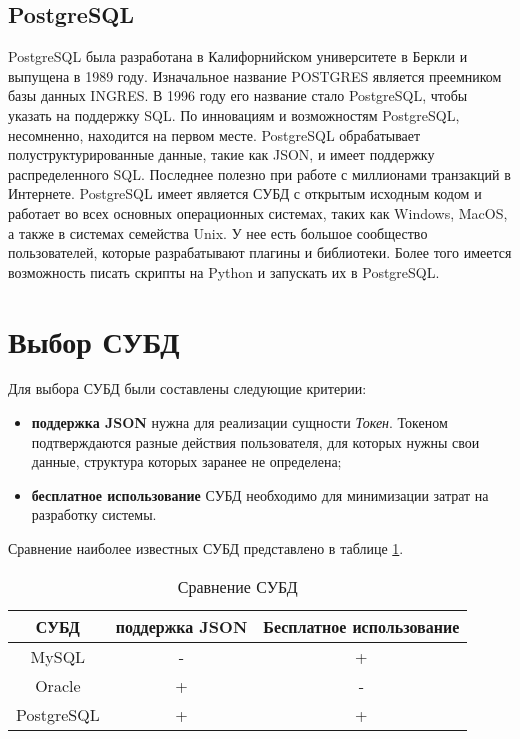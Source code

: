 \subsection{PostgreSQL}

PostgreSQL\cite{postgresql} была разработана в Калифорнийском университете в Беркли и выпущена в 1989 году. Изначальное название POSTGRES является преемником базы данных INGRES. В 1996 году его название стало PostgreSQL, чтобы указать на поддержку SQL. По инновациям и возможностям PostgreSQL, несомненно, находится на первом месте. PostgreSQL обрабатывает полуструктурированные данные, такие как JSON, и имеет поддержку распределенного SQL. Последнее полезно при работе с миллионами транзакций в Интернете. PostgreSQL имеет является СУБД с открытым исходным кодом и работает во всех основных операционных системах, таких как Windows, MacOS, а также в системах семейства Unix. У нее есть большое сообщество пользователей, которые разрабатывают плагины и библиотеки. Более того имеется возможность писать скрипты на Python и запускать их в PostgreSQL.



\section{Выбор СУБД}
Для выбора СУБД были составлены следующие критерии:
\begin{itemize}
    \item \textbf{поддержка JSON} нужна для реализации сущности \textit{Токен}. Токеном подтверждаются разные действия пользователя, для которых нужны свои данные, структура которых заранее не определена; 
    \item \textbf{бесплатное использование} СУБД необходимо для минимизации затрат на разработку системы.
\end{itemize}

Сравнение наиболее известных СУБД представлено в таблице \ref{tab:comparedbms}.

\begin{table}[th]
    \centering
    \caption{Сравнение СУБД}
    \label{tab:comparedbms}
    \begin{tabular}{|c|c|c|}
         \hline
         \textbf{СУБД} & \textbf{поддержка JSON} & \textbf{Бесплатное использование} \\
         \hline
         MySQL & - & + \\
         \hline
         Oracle & + & - \\
         \hline
         PostgreSQL & + & + \\
         \hline
    \end{tabular}
\end{table}

